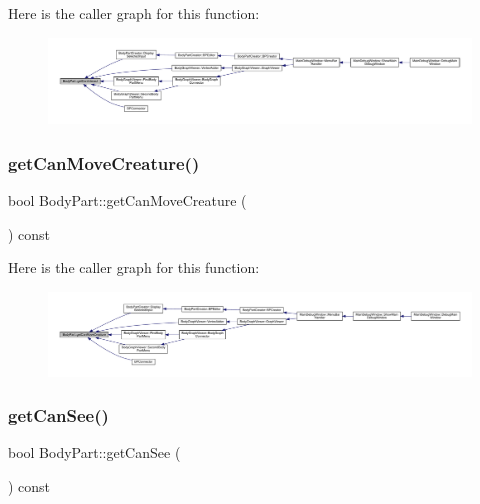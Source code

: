 Here is the caller graph for this function\+:
\nopagebreak
\begin{figure}[H]
\begin{center}
\leavevmode
\includegraphics[width=350pt]{d2/d6f/class_body_part_a9a53de5a283928eb78986c3195d0f1b9_icgraph}
\end{center}
\end{figure}
\mbox{\label{class_body_part_a77da57c41bc2b7bde4f35d13298224ca}} 
\subsubsection{\texorpdfstring{get\+Can\+Move\+Creature()}{getCanMoveCreature()}}
{\footnotesize\ttfamily bool Body\+Part\+::get\+Can\+Move\+Creature (\begin{DoxyParamCaption}{ }\end{DoxyParamCaption}) const}

Here is the caller graph for this function\+:
\nopagebreak
\begin{figure}[H]
\begin{center}
\leavevmode
\includegraphics[width=350pt]{d2/d6f/class_body_part_a77da57c41bc2b7bde4f35d13298224ca_icgraph}
\end{center}
\end{figure}
\mbox{\label{class_body_part_ab1a17aec7b3aa4d388fb9c8421cdc519}} 
\subsubsection{\texorpdfstring{get\+Can\+See()}{getCanSee()}}
{\footnotesize\ttfamily bool Body\+Part\+::get\+Can\+See (\begin{DoxyParamCaption}{ }\end{DoxyParamCaption}) const}

